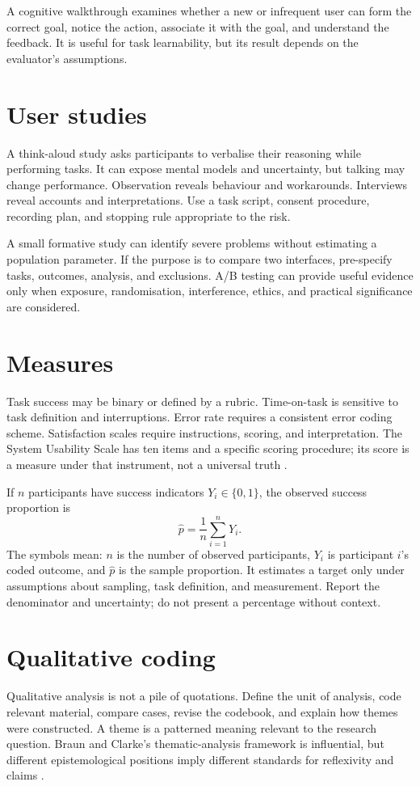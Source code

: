A cognitive walkthrough examines whether a new or infrequent user can form the correct goal, notice the action, associate it with the goal, and understand the feedback. It is useful for task learnability, but its result depends on the evaluator's assumptions.

\section{User studies}
A think-aloud study asks participants to verbalise their reasoning while performing tasks. It can expose mental models and uncertainty, but talking may change performance. Observation reveals behaviour and workarounds. Interviews reveal accounts and interpretations. Use a task script, consent procedure, recording plan, and stopping rule appropriate to the risk.

A small formative study can identify severe problems without estimating a population parameter. If the purpose is to compare two interfaces, pre-specify tasks, outcomes, analysis, and exclusions. A/B testing can provide useful evidence only when exposure, randomisation, interference, ethics, and practical significance are considered.

\section{Measures}
Task success may be binary or defined by a rubric. Time-on-task is sensitive to task definition and interruptions. Error rate requires a consistent error coding scheme. Satisfaction scales require instructions, scoring, and interpretation. The System Usability Scale has ten items and a specific scoring procedure; its score is a measure under that instrument, not a universal truth \citep{brooke1996sus}.

If $n$ participants have success indicators $Y_i\in\{0,1\}$, the observed success proportion is
\[
\hat p=\frac{1}{n}\sum_{i=1}^{n}Y_i.
\]
The symbols mean: $n$ is the number of observed participants, $Y_i$ is participant $i$'s coded outcome, and $\hat p$ is the sample proportion. It estimates a target only under assumptions about sampling, task definition, and measurement. Report the denominator and uncertainty; do not present a percentage without context.

\section{Qualitative coding}
Qualitative analysis is not a pile of quotations. Define the unit of analysis, code relevant material, compare cases, revise the codebook, and explain how themes were constructed. A theme is a patterned meaning relevant to the research question. Braun and Clarke's thematic-analysis framework is influential, but different epistemological positions imply different standards for reflexivity and claims \citep{braun2006thematic}.

